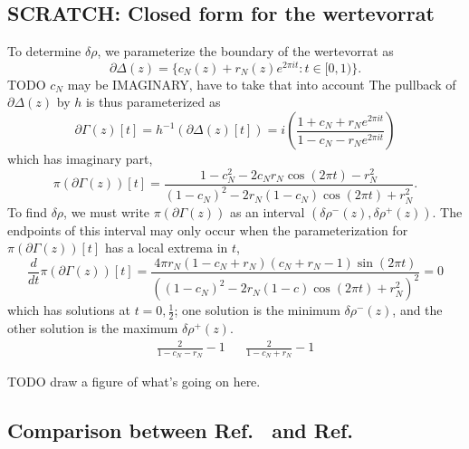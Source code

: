 \subsection{SCRATCH: Closed form for the wertevorrat}

To determine $\delta\rho$, we parameterize the boundary of the wertevorrat as
\begin{equation}
    \partial \Delta(z) = \{ c_N(z) + r_N(z) e^{2\pi i t} : t\in [0, 1)\}.
\end{equation}
{\color{red}TODO $c_N$ may be IMAGINARY, have to take that into account}
The pullback of $\partial\Delta(z)$ by $h$ is thus parameterized as
\begin{equation}
    \partial \Gamma(z)[t] = h^{-1}(\partial\Delta(z)[t]) = i \left( \frac{1 + c_N + r_N e^{2\pi i t}}{1 - c_N - r_N e^{2\pi i t}} \right)
\end{equation}
which has imaginary part,
\begin{equation}
    \pi(\partial\Gamma(z))[t] = \frac{1 - c_N^2 - 2 c_N r_N \cos (2\pi t) - r_N^2}{(1 - c_N)^2 - 2 r_N (1 - c_N) \cos(2\pi t) + r_N^2}.
\end{equation}
To find $\delta\rho$, we must write $\pi(\partial\Gamma(z))$ as an interval $(\delta\rho^-(z), \delta\rho^+(z))$. The endpoints of this interval may only occur when the parameterization for $\pi(\partial\Gamma(z))[t]$ has a local extrema in $t$,
\begin{equation}
    \frac{d}{dt} \pi(\partial\Gamma(z))[t] = \frac{4\pi r_N (1 - c_N + r_N) (c_N + r_N - 1) \sin (2\pi t)}{ ( (1 - c_N)^2 - 2 r_N (1 - c) \cos(2\pi t)  + r_N^2  )^2} = 0
\end{equation}
which has solutions at $t = 0, \frac{1}{2}$; one solution is the minimum $\delta\rho^-(z)$, and the other solution is the maximum $\delta\rho^+(z)$. 
\begin{align}
    \frac{2}{1 - c_N - r_N} - 1 && \frac{2}{1 - c_N + r_N} - 1
\end{align}


{\color{red}TODO draw a figure of what's going on here.}

\subsection{Comparison between Ref.~\cite{fei2021nevanlinna} and Ref.\cite{https://doi.org/10.48550/arxiv.1405.3578}}

